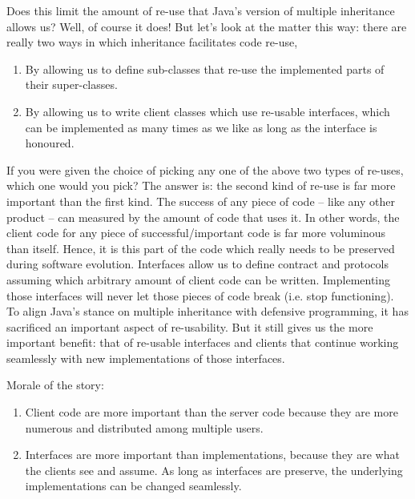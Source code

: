 \documentclass[12pt,a4paper]{article}
\begin{document}
Does this limit the amount of re-use that Java's version of multiple inheritance allows us? Well, of course it does! But let's look at the matter this way: there are really two ways in which inheritance facilitates code re-use,
\begin{enumerate}
	\item By allowing us to define sub-classes that re-use the implemented parts of their super-classes.
	\item By allowing us to write client classes which use re-usable interfaces, which can be implemented as many times as we like as long as the interface is honoured.
\end{enumerate}

If you were given the choice of picking any one of the above two types of re-uses, which one would you pick? The answer is: the second kind of re-use is far more important than the first kind. The success of any piece of code -- like any other product -- can measured by the amount of code that uses it. In other words, the client code for any piece of successful/important code is far more voluminous than itself. Hence, it is this part of the code which really needs to be preserved during software evolution. Interfaces allow us to define contract and protocols assuming which arbitrary amount of client code can be written. Implementing those interfaces will never let those pieces of code break (i.e. stop functioning). To align Java's stance on multiple inheritance with defensive programming, it has sacrificed an important aspect of re-usability. But it still gives us the more important benefit: that of re-usable interfaces and clients that continue working seamlessly with new implementations of those interfaces.

Morale of the story:
\begin{enumerate}
	\item Client code are more important than the server code because they are more numerous and distributed among multiple users.
	\item Interfaces are more important than implementations, because they are what the clients see and assume. As long as interfaces are preserve, the underlying implementations can be changed seamlessly.
\end{enumerate}
\end{document}
